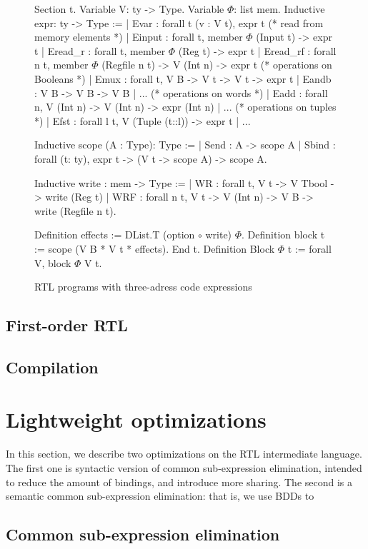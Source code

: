 \documentclass[preprint]{sigplanconf}
\begin{document}
\begin{figure}
  \centering
\begin{coq}
Section t. 
Variable V: ty -> Type. Variable $\Phi$: list mem. 
Inductive expr: ty -> Type :=
| Evar : forall t (v : V t), expr t
(* read from memory elements *)
| Einput : forall t, member $\Phi$ (Input t) -> expr t
| Eread_r : forall t, member $\Phi$ (Reg t) -> expr t
| Eread_rf : forall n t, member $\Phi$ (Regfile n t) -> V (Int n) -> expr t
(* operations on Booleans *)
| Emux : forall t, V B -> V t -> V t -> expr t
| Eandb : V B -> V B -> V B | ... 
(* operations on words *)
| Eadd : forall n, V (Int n) -> V (Int n) -> expr (Int n) | ... 
(* operations on tuples *)
| Efst : forall l t, V (Tuple (t::l)) -> expr t | ...

Inductive scope (A : Type): Type :=
| Send : A -> scope A
| Sbind : forall (t: ty), expr t -> (V t -> scope A) -> scope A. 

Inductive write : mem -> Type :=
| WR : forall t, V t -> V Tbool -> write (Reg t)
| WRF : forall n t, V t -> V (Int n) -> V B ->  write (Regfile n t). 
     
Definition effects := DList.T (option $\circ$ write) $\Phi$. 
Definition block t := scope (V B * V t *  effects).         
End t.
Definition Block $\Phi$ t := forall V, block $\Phi$ V t.
\end{coq}
  \caption{RTL programs with three-adress code expressions}
  \label{fig:rtl}
\end{figure}

\subsection{First-order RTL}

\subsection{Compilation} 

\section{Lightweight optimizations}
In this section, we describe two optimizations on the RTL intermediate
language. The first one is syntactic version of common sub-expression
elimination, intended to reduce the amount of bindings, and introduce
more sharing. The second is a semantic common sub-expression
elimination: that is, we use BDDs to 

\subsection{Common sub-expression elimination}
\end{document}
